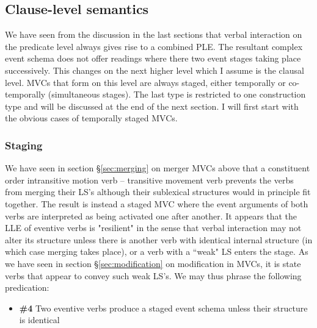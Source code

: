 \subsection{Clause-level semantics} \label{sec:clause-level}

We have seen from the discussion in the last sections that verbal interaction on the predicate level always gives rise to a combined PLE. The resultant complex event schema does not offer readings where there two event stages taking place successively. This changes on the next higher level which I assume is the clausal level. MVCs that form on this level are always staged, either temporally or co-temporally (simultaneous stages). The last type is restricted to one construction type and will be discussed at the end of the next section. I will first start with the obvious cases of temporally staged MVCs.

\subsubsection{Staging}\label{sec:staging}

We have seen in section §\ref{sec:merging} on merger MVCs above that a constituent order intransitive motion verb -- transitive movement verb prevents the verbs from merging their LS's although their sublexical structures would in principle fit together. The result is instead a staged MVC where the event arguments of both verbs are interpreted as being activated one after another. It appears that the LLE of eventive verbs is "resilient" in the sense that verbal interaction may not alter its structure unless there is another verb with identical internal structure (in which case merging takes place), or a verb with a ``weak" LS enters the stage. As we have seen in section §\ref{sec:modification} on modification in MVCs, it is state verbs that appear to convey such weak LS's. We may thus phrase the following predication:

\begin{itemize}
\item \textbf{\#4} Two eventive verbs produce a staged event schema unless their structure is identical
\end{itemize}

